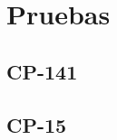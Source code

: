 \chapter{Pruebas}
\section{CP-141} %
\section{CP-15}

\begin{comment}
\section{Submódulos}


\subsection{Esquema de Experiencia}
    
 Es la especificación de los conceptos relacionados con los puntos de experiencia, cuales
 son los tipos de incremento y cómo se usan y cuales restricciones se aplican para la
 implementación de los puntos de experiencia, niveles y la acción subir de nivel.

\subsubsection{Conceptos de puntos de experiencia}
\noindent Como se especificó en el marco teórico, los puntos de experiencia son una unidad que representa la cantidad de actividades completadas por un usuario, sin embargo, se puede referir en diversos contextos a estos puntos. Es por ello que se utilizarán conceptos definidos por los cuadros  \hyperref[table:METerminosExperiencia1]{6.1} y  \hyperref[table:METerminosExperiencia2]{6.2} .\\

\noindent Para poder explicar mejor los conceptos que se tienen para los puntos de experiencia, se utilizará un ejemplo y cada concepto en los cuadros  \hyperref[table:METerminosExperiencia1]{6.1} y  \hyperref[table:METerminosExperiencia2]{6.2} , tendrá su relación con este ejemplo.\\


\end{comment}
